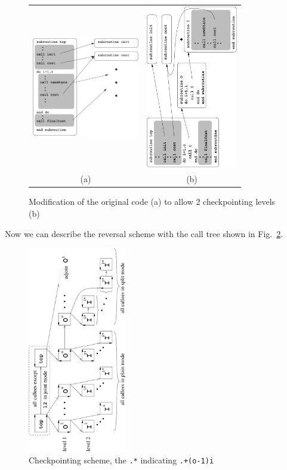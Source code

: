 \documentclass{book}
\newcommand{\reffig}[1]{{Fig.~\ref{#1}}}
\begin{document}
\begin{figure}
\begin{tabular}{cc}
\begin{minipage}{5cm}
\includegraphics[height=4.3cm]{checkpointLoops}
\end{minipage}
&
\begin{minipage}{6cm}
\includegraphics[width=4cm,angle=-90,origin=c]{checkpointLoopsNew2}
\vspace*{-2cm}
\end{minipage}\\
(a)& (b)
\end{tabular}
\caption{Modification of the original code (a) to allow 2 checkpointing levels (b)}\label{fig:checkpointLoops}
\end{figure}
Now we can describe the reversal scheme with the call tree shown in \reffig{fig:checkpointct}.
\begin{figure}
\begin{center}
\includegraphics[width=4.3cm,angle=-90, origin=c]{swMode}
\vspace*{-3cm}
\end{center}
\caption{Checkpointing scheme, the {\tt .*} indicating {\tt .+(o-1)i}} \label{fig:checkpointct}
\end{figure}
\end{document}
